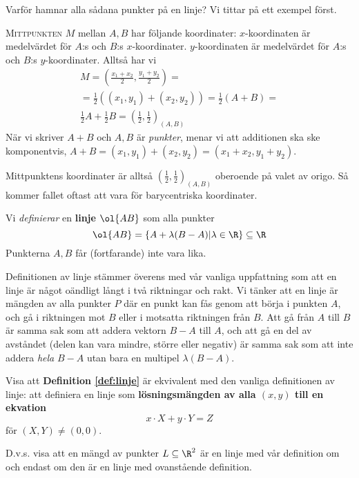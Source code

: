 Varför hamnar alla sådana punkter på en linje? Vi tittar på ett exempel först.

\begin{Exempel}
    \textsc{Mittpunkten} $M$ mellan $A, B$ har följande koordinater:
    $x$-koordinaten är medelvärdet för $A$:s och $B$:s $x$-koordinater.
    $y$-koordinaten är medelvärdet för $A$:s och $B$:s $y$-koordinater.
    Alltså har vi
    \begin{eqnarray*}
    M = \left( \frac{x_1 + x_2}{2}, \frac{y_1 + y_2}{2} \right) = \\
    = \frac{1}{2}((x_1, y_1) + (x_2, y_2)) = \frac{1}{2}(A + B) = \\
    \frac{1}{2}A + \frac{1}{2}B = \left( \frac{1}{2}, \frac{1}{2}\right)_{(A, B)}
    \end{eqnarray*}
    När vi skriver $A + B$ och $A, B$ är \textit{punkter}, menar vi att
    additionen ska ske komponentvis,
    $A+B = (x_1, y_1) + (x_2, y_2) = (x_1 + x_2, y_1 + y_2)$.

    Mittpunktens koordinater är alltså $\left( \frac{1}{2}, \frac{1}{2}\right)_{(A, B)}$
    oberoende på valet av origo. Så kommer fallet oftast att vara för barycentriska koordinater.
\end{Exempel}


\begin{Definition}
\label{def:linje}
Vi \emph{definierar} en \textbf{linje} $\ol{AB}$ som alla punkter 
\[\ol{AB} = \{ A + \lambda (B - A) | \lambda \in \R \} \subseteq \R\]
Punkterna $A, B$ får (fortfarande) inte vara lika.
\end{Definition}
Definitionen av linje stämmer överens med vår vanliga uppfattning som att en linje är något oändligt
långt i två riktningar och rakt. Vi tänker att en linje är mängden av alla punkter $P$
där en punkt kan fås genom att börja i punkten $A$, och gå i riktningen mot $B$ eller
i motsatta riktningen från $B$. Att gå från $A$ till $B$ är samma sak som att addera vektorn $B-A$ till $A$,
och att gå en del av avståndet (delen kan vara mindre, större eller negativ) är samma sak
som att inte addera \textit{hela} $B-A$ utan bara en multipel $\lambda(B-A)$.

\begin{Uppgift}
    Visa att \textbf{Definition \ref{def:linje}} är ekvivalent med den vanliga definitionen
    av linje: att definiera en linje
    som \textbf{lösningsmängden av alla $(x, y)$ till en ekvation}
    \[
    x\cdot X + y\cdot Y = Z
    \]
    för $(X, Y)\neq (0, 0)$.

    D.v.s. visa att en mängd av punkter $L\subseteq \R^2$ är en linje med vår definition om och endast om
    den är en linje med ovanstående definition.
\end{Uppgift}



